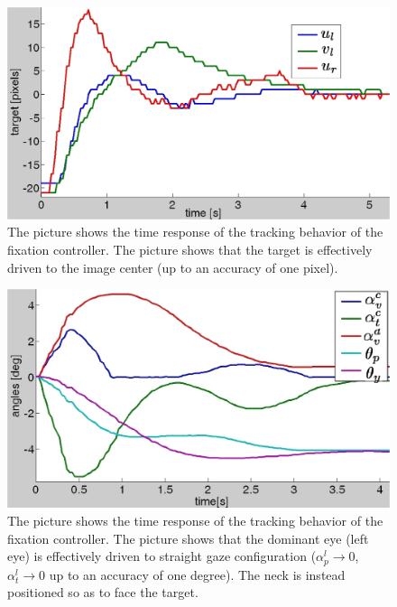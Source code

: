 \begin{figure}[tbp]
\centering
\includegraphics[width=130mm]{Figure/TimeResponseImage.jpg}
\caption{The picture shows the time response of the tracking behavior of the fixation controller. The picture shows that the target is effectively driven to the image center (up to an accuracy of one pixel).}
\label{Fig:TimeResponse}
\end{figure}

\begin{figure}[tbp]
\centering
\includegraphics[width=130mm]{Figure/TimeResponseEyesNeck.eps}
\caption{The picture shows the time response of the tracking behavior of the fixation controller. The picture shows that the dominant eye (left eye) is effectively driven to straight gaze configuration ($\alpha_p^l \rightarrow 0$, $\alpha_t^l \rightarrow 0$ up to an accuracy of one degree). The neck is instead positioned so as to face the target.}
\label{Fig:TimeResponseNeck}
\end{figure}
